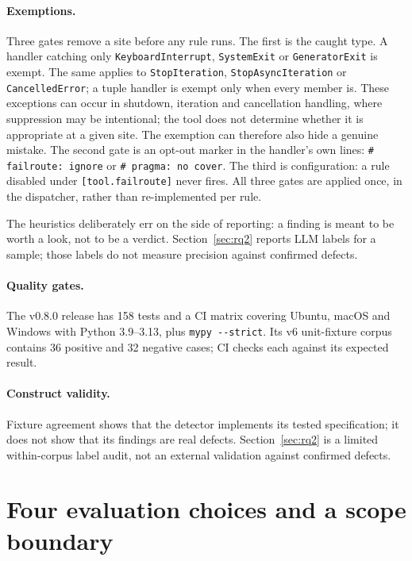 \documentclass[10pt,a4paper]{article}
\begin{document}
\paragraph{Exemptions.} Three gates remove a site before any rule runs. The
first is the caught type. A handler catching only \texttt{KeyboardInterrupt},
\texttt{SystemExit} or \texttt{GeneratorExit} is exempt. The same applies to
\texttt{StopIteration}, \texttt{StopAsyncIteration} or
\texttt{CancelledError}; a tuple handler is exempt only when every member is.
These exceptions can occur in
shutdown, iteration and cancellation handling, where suppression may be
intentional; the tool does not determine whether it is appropriate at a given
site. The exemption can therefore also hide a genuine mistake. The second gate
is an opt-out marker in the handler's own lines:
\texttt{\# failroute: ignore} or \texttt{\# pragma: no cover}. The third is
configuration: a rule disabled under \texttt{[tool.failroute]} never fires. All
three gates are applied once, in the dispatcher, rather than re-implemented per
rule.

The heuristics deliberately err on the side of reporting: a finding is meant to
be worth a look, not to be a verdict. Section~\ref{sec:rq2} reports LLM labels
for a sample; those labels do not measure precision against confirmed defects.

\paragraph{Quality gates.} The v0.8.0 release has 158 tests and a CI matrix
covering Ubuntu, macOS and Windows with Python 3.9--3.13, plus
\texttt{mypy -{}-strict}. Its v6 unit-fixture corpus contains 36 positive and 32
negative cases; CI checks each against its expected result.

\paragraph{Construct validity.} Fixture agreement shows that the detector
implements its tested specification; it does not show that its findings are
real defects. Section~\ref{sec:rq2} is a limited within-corpus label audit,
not an external validation against confirmed defects.

\section{Four evaluation choices and a scope boundary}
\label{sec:choices}
\end{document}
